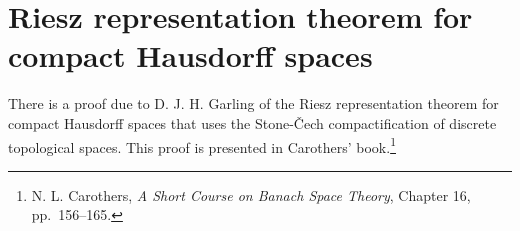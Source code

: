 \documentclass{article}
\theoremstyle{definition}
\begin{document}
\section{Riesz representation theorem for compact Hausdorff spaces}
There is a proof due to D. J. H. Garling  of the Riesz representation theorem for compact Hausdorff
spaces that uses the Stone-\v{C}ech compactification of discrete topological spaces. This
proof is presented in Carothers' book.\footnote{N. L. Carothers, {\em A Short Course on Banach
Space Theory}, Chapter 16, pp.~156--165.}
\end{document}

